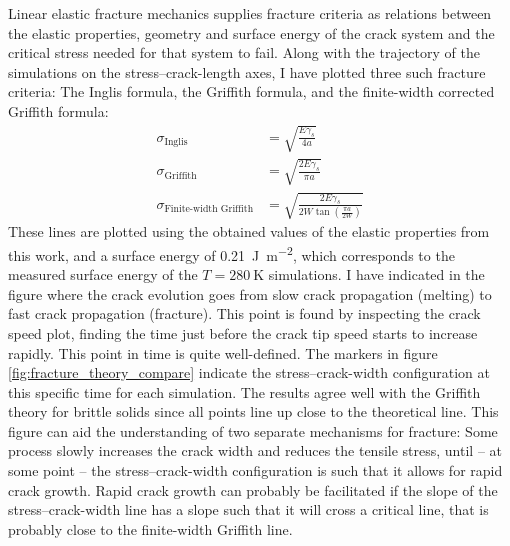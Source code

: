 Linear elastic fracture mechanics supplies fracture criteria as relations between the elastic properties, geometry and surface energy of the crack system and the critical stress needed for that system to fail. Along with the trajectory of the simulations on the stress--crack-length axes, I have plotted three such fracture criteria: The Inglis formula, the Griffith formula, and the finite-width corrected Griffith formula:
\begin{align}
\sigma_{\text{Inglis}} & = \sqrt{\frac{E\gamma_s}{4a}} \\
\sigma_{\text{Griffith}} & = \sqrt{\frac{2E\gamma_s}{\pi a}} \\
\sigma_{\text{Finite-width Griffith}} & = \sqrt{\frac{2E\gamma_s}{2W\tan\left( \frac{\pi a}{2W}\right)}}
\end{align}
These lines are plotted using the obtained values of the elastic properties from this work, and a surface energy of \SI{0.21}{\joule\per\meter\squared}, which corresponds to the measured surface energy of the $T = \SI{280}{\kelvin}$ simulations. 
 I have indicated in the figure where the crack evolution goes from slow crack propagation (melting) to fast crack propagation (fracture). This point is found by inspecting the crack speed plot, finding the time just before the crack tip speed starts to increase rapidly. This point in time is quite well-defined. The markers in figure \ref{fig:fracture_theory_compare} indicate the stress--crack-width configuration at this specific time for each simulation. 
 The results agree well with the Griffith theory for brittle solids since all points line up close to the theoretical line. This figure can aid the understanding of two separate mechanisms for fracture: Some process slowly increases the crack width and reduces the tensile stress, until -- at some point -- the stress--crack-width configuration is such that it allows for rapid crack growth. Rapid crack growth can probably be facilitated if the slope of the stress--crack-width line has a slope such that it will cross a critical line, that is probably close to the finite-width Griffith line.

